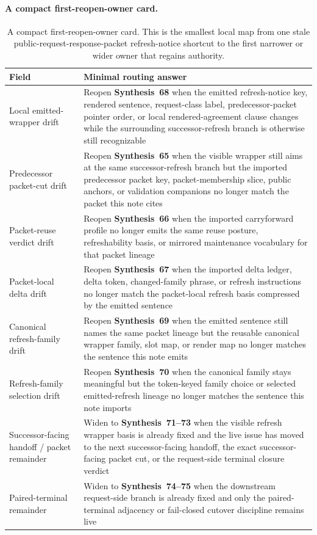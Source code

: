 \documentclass[11pt]{article}
\begin{document}
\paragraph{A compact first-reopen-owner card.}
\begin{table}[t]
\centering
\small
\begin{tabularx}{\linewidth}{@{}lX@{}}
\toprule
Field & Minimal routing answer \\
\midrule
Local emitted-wrapper drift & Reopen \textbf{Synthesis~68} when the emitted refresh-notice key, rendered sentence, request-class label, predecessor-packet pointer order, or local rendered-agreement clause changes while the surrounding successor-refresh branch is otherwise still recognizable \\
Predecessor packet-cut drift & Reopen \textbf{Synthesis~65} when the visible wrapper still aims at the same successor-refresh branch but the imported predecessor packet key, packet-membership slice, public anchors, or validation companions no longer match the packet this note cites \\
Packet-reuse verdict drift & Reopen \textbf{Synthesis~66} when the imported carryforward profile no longer emits the same reuse posture, refreshability basis, or mirrored maintenance vocabulary for that packet lineage \\
Packet-local delta drift & Reopen \textbf{Synthesis~67} when the imported delta ledger, delta token, changed-family phrase, or refresh instructions no longer match the packet-local refresh basis compressed by the emitted sentence \\
Canonical refresh-family drift & Reopen \textbf{Synthesis~69} when the emitted sentence still names the same packet lineage but the reusable canonical wrapper family, slot map, or render map no longer matches the sentence this note emits \\
Refresh-family selection drift & Reopen \textbf{Synthesis~70} when the canonical family stays meaningful but the token-keyed family choice or selected emitted-refresh lineage no longer matches the sentence this note imports \\
Successor-facing handoff / packet remainder & Widen to \textbf{Synthesis~71--73} when the visible refresh wrapper basis is already fixed and the live issue has moved to the next successor-facing handoff, the exact successor-facing packet cut, or the request-side terminal closure verdict \\
Paired-terminal remainder & Widen to \textbf{Synthesis~74--75} when the downstream request-side branch is already fixed and only the paired-terminal adjacency or fail-closed cutover discipline remains live \\
\bottomrule
\end{tabularx}
\caption{A compact first-reopen-owner card. This is the smallest local map from one stale public-request-response-packet refresh-notice shortcut to the first narrower or wider owner that regains authority.}
\label{tab:first-reopen-owner-card-public-request-response-packet-refresh-notices}
\end{table}
\end{document}
